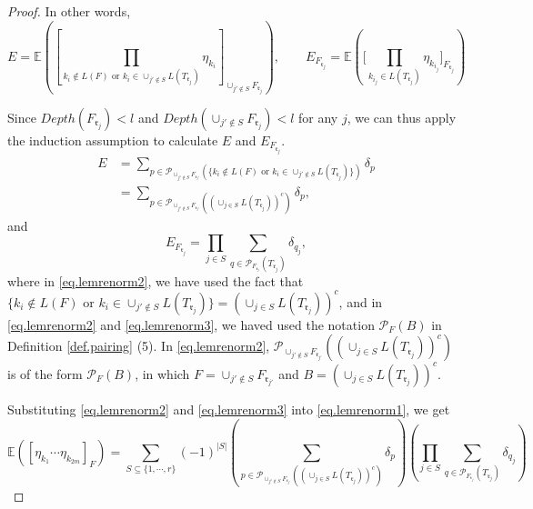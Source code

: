 \begin{proof}
In other words, 
\begin{equation}
    E = \mathbb{E}\left(\left[\prod_{k_i\notin L(F)\text{ or }k_i\in \cup_{j'\notin S}L(T_{\mathfrak{r}_j})}\eta_{k_i}\right]_{\cup_{j'\notin S}F_{\mathfrak{r}_j}}\right), 
    \qquad 
    E_{F_{\mathfrak{r}_j}} = \mathbb{E}\left(\Bigg[\prod_{k_{i_{j}}\in L(T_{\mathfrak{r}_j})}\eta_{k_{i_j}}\Bigg]_{F_{\mathfrak{r}_j}}\right)
\end{equation}

Since $Depth(F_{\mathfrak{r}_j})<l$ and $Depth(\cup_{j'\notin S}F_{\mathfrak{r}_j})<l$ for any $j$, we can thus apply the induction assumption to calculate $E$ and $E_{F_{\mathfrak{r}_j}}$.
\begin{equation}\label{eq.lemrenorm2}
    \begin{split}
        E &= \sum_{p\in \mathcal{P}_{\cup_{j'\notin S} F_{\mathfrak{r}_{j'}}}(\{k_i\notin L(F)\text{ or }k_i\in \cup_{j'\notin S}L(T_{\mathfrak{r}_j})\})}\delta_p
        \\
        &= \sum_{p\in \mathcal{P}_{\cup_{j'\notin S} F_{\mathfrak{r}_{j'}}}((\cup_{j\in S}L(T_{\mathfrak{r}_j}))^c)}\delta_p,
    \end{split}
\end{equation}
and
\begin{equation}\label{eq.lemrenorm3}
    E_{F_{\mathfrak{r}_j}} = \prod_{j\in S}\sum_{q\in \mathcal{P}_{F_{\mathfrak{r}_j}}(T_{\mathfrak{r}_j})} \delta_{q_j},
\end{equation}
where in \eqref{eq.lemrenorm2}, we have used the fact that $\{k_i\notin L(F)\text{ or }k_i\in \cup_{j'\notin S}L(T_{\mathfrak{r}_j})\} = (\cup_{j\in S}L(T_{\mathfrak{r}_j}))^c$, and in \eqref{eq.lemrenorm2} and \eqref{eq.lemrenorm3}, we haved used the notation $\mathcal{P}_{F}(B)$ in Definition \ref{def.pairing} (5). In \eqref{eq.lemrenorm2}, $\mathcal{P}_{\cup_{j'\notin S} F_{\mathfrak{r}_{j'}}}((\cup_{j\in S}L(T_{\mathfrak{r}_j}))^c)$ is of the form $\mathcal{P}_{F}(B)$, in which $F = \cup_{j'\notin S} F_{\mathfrak{r}_{j'}}$ and $B = (\cup_{j\in S}L(T_{\mathfrak{r}_j}))^c$.

Substituting \eqref{eq.lemrenorm2} and \eqref{eq.lemrenorm3} into \eqref{eq.lemrenorm1}, we get 
\begin{equation}
    \mathbb{E}([\eta_{k_1}\cdots \eta_{k_{2m}}]_F) =\sum_{S\subseteq\{1,\cdots,r\}}(-1)^{|S|}
    \left(\sum_{p\in \mathcal{P}_{\cup_{j'\notin S} F_{\mathfrak{r}_{j'}}}((\cup_{j\in S}L(T_{\mathfrak{r}_j}))^c)}\delta_p\right)
    \left(\prod_{j\in S}\sum_{q\in \mathcal{P}_{F_{\mathfrak{r}_j}}(T_{\mathfrak{r}_j})} \delta_{q_j}\right)
\end{equation}



\end{proof}
